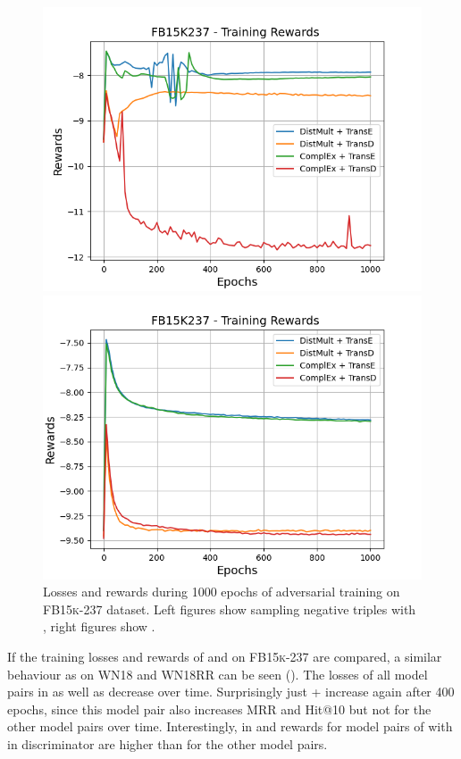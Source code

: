 \begin{figure}[H]
\begin{minipage}{.45\textwidth}
      \includegraphics[width=0.9\linewidth]{figures/results/gan_train/not_pretrained/uncertainty/max/entropy/fb15k237/1k_epochs/uncertainty_fb15k237_rew.png}
    \end{minipage}%
    \begin{minipage}{.45\textwidth}
      \centering
      \includegraphics[width=0.9\linewidth]{figures/results/gan_train/not_pretrained/uncertainty/max_distribution/entropy/fb15k237/1k_epochs/uncertainty_fb15k237_rew.png}
    \end{minipage}%
    \caption{Losses and rewards during 1000 epochs of adversarial training on \textsc{FB15k-237} dataset. 
    Left figures show sampling negative triples with \usmax, right figures show \ussoftmax.}
    \label{fig:advtrain_fb15k237_usmax_ussoftmax_losses_rewards}
\end{figure}
If the training losses and rewards of \usmax and \usmax on \textsc{FB15k-237} are compared, a similar behaviour as on \textsc{WN18} and \textsc{WN18RR} can be seen ().
The losses of all model pairs in \usmax as well as \ussoftmax decrease over time.
Surprisingly just \complex + \transe increase again after 400 epochs, since this model pair also increases MRR and Hit@10 but not for the other model pairs over time.
Interestingly, in \usmax and \ussoftmax rewards for model pairs of with \transe in discriminator are higher than for the other model pairs.